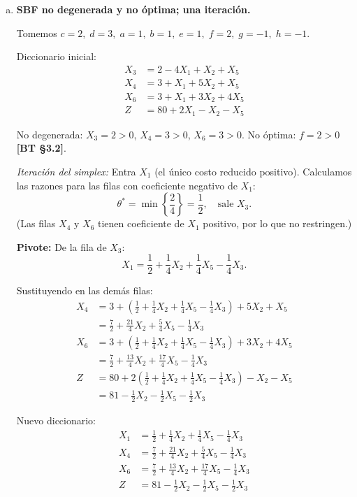\documentclass{article}
\begin{document}
\begin{enumerate}[a)]
\item \textbf{SBF no degenerada y no óptima; una iteración.}

Tomemos $c=2,\; d=3,\; a=1,\; b=1,\; e=1,\; f=2,\; g=-1,\; h=-1$.

Diccionario inicial:
\begin{align*}
X_3 &= 2 - 4X_1 + X_2 + X_5 \\
X_4 &= 3 + X_1 + 5X_2 + X_5 \\
X_6 &= 3 + X_1 + 3X_2 + 4X_5 \\
Z   &= 80 + 2X_1 - X_2 - X_5
\end{align*}

No degenerada: $X_3=2>0$, $X_4=3>0$, $X_6=3>0$. No óptima: $f=2>0$ \textbf{[BT §3.2]}.

\textit{Iteración del simplex:} Entra $X_1$ (el único costo reducido positivo). Calculamos las razones para las filas con coeficiente negativo de $X_1$:
\[
  \theta^* = \min\left\{\frac{2}{4}\right\} = \frac{1}{2}, \quad \text{sale } X_3.
\]
(Las filas $X_4$ y $X_6$ tienen coeficiente de $X_1$ positivo, por lo que no restringen.)

\textbf{Pivote:} De la fila de $X_3$:
\[
  X_1 = \frac{1}{2} + \frac{1}{4}X_2 + \frac{1}{4}X_5 - \frac{1}{4}X_3.
\]

Sustituyendo en las demás filas:
\begin{align*}
X_4 &= 3 + \left(\frac{1}{2}+\frac{1}{4}X_2+\frac{1}{4}X_5-\frac{1}{4}X_3\right) + 5X_2 + X_5 \\
    &= \frac{7}{2} + \frac{21}{4}X_2 + \frac{5}{4}X_5 - \frac{1}{4}X_3 \\[4pt]
X_6 &= 3 + \left(\frac{1}{2}+\frac{1}{4}X_2+\frac{1}{4}X_5-\frac{1}{4}X_3\right) + 3X_2 + 4X_5 \\
    &= \frac{7}{2} + \frac{13}{4}X_2 + \frac{17}{4}X_5 - \frac{1}{4}X_3 \\[4pt]
Z   &= 80 + 2\left(\frac{1}{2}+\frac{1}{4}X_2+\frac{1}{4}X_5-\frac{1}{4}X_3\right) - X_2 - X_5 \\
    &= 81 - \frac{1}{2}X_2 - \frac{1}{2}X_5 - \frac{1}{2}X_3
\end{align*}

Nuevo diccionario:
\begin{align*}
X_1 &= \frac{1}{2} + \frac{1}{4}X_2 + \frac{1}{4}X_5 - \frac{1}{4}X_3 \\
X_4 &= \frac{7}{2} + \frac{21}{4}X_2 + \frac{5}{4}X_5 - \frac{1}{4}X_3 \\
X_6 &= \frac{7}{2} + \frac{13}{4}X_2 + \frac{17}{4}X_5 - \frac{1}{4}X_3 \\
Z   &= 81 - \frac{1}{2}X_2 - \frac{1}{2}X_5 - \frac{1}{2}X_3
\end{align*}


\end{enumerate}
\end{document}
